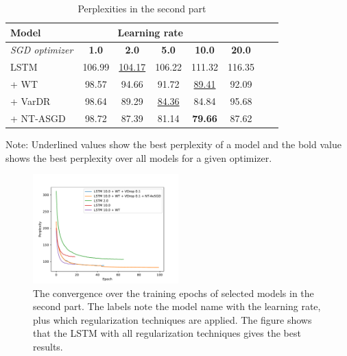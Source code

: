 \documentclass[a4paper]{article}
\begin{document}
\begin{table}
  \caption{Perplexities in the second part}
  \label{tab:dataPart2}
  \begin{tabular}{l|c c c c c c c}
    \toprule
    \textbf{Model} & \multicolumn{4}{c}{\textbf{Learning rate} } \\
    \midrule
    \textit{SGD optimizer} & \textbf{1.0} & \textbf{2.0} & \textbf{5.0} & \textbf{10.0} & \textbf{20.0} \\
    \midrule
    LSTM      & 106.99  & \underline{104.17}  & 106.22              & 111.32            & 116.35 \\ 
    + WT      & 98.57   & 94.66               & 91.72               & \underline{89.41} & 92.09 \\ 
    + VarDR   & 98.64   & 89.29               & \underline{84.36}   & 84.84             & 95.68 \\ 
    + NT-ASGD & 98.72   & 87.39               & 81.14               & \textbf{79.66}    & 87.62 \\ 
    \bottomrule
  \end{tabular}
  \begin{minipage}{8.5cm}
    \vspace{0.1cm}
    Note: Underlined values show the best perplexity of a model and the bold value shows the best perplexity over all models for a given optimizer. 
  \end{minipage}
\end{table}

\begin{figure}[htbp]
  \centering
  \includegraphics[width=0.5\textwidth]{part2_convergence.pdf}
  \caption{The convergence over the training epochs of selected models in the second part. The labels note the model name with the learning rate, plus which regularization techniques are applied. The figure shows that the LSTM with all regularization techniques gives the best results.}
  \label{fig:part_2_convergence}  
\end{figure}




\end{document}
